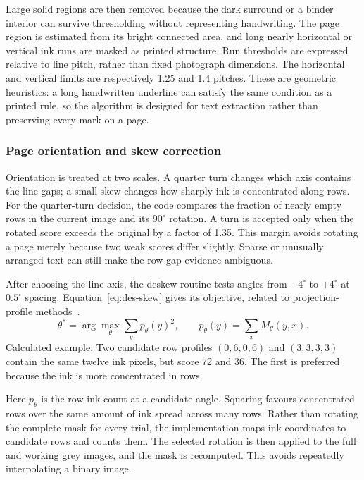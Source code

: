 Large solid regions are then removed because the dark surround or a binder interior can survive thresholding without representing handwriting. The page region is estimated from its bright connected area, and long nearly horizontal or vertical ink runs are masked as printed structure. Run thresholds are expressed relative to line pitch, rather than fixed photograph dimensions. The horizontal and vertical limits are respectively 1.25 and 1.4 pitches. These are geometric heuristics: a long handwritten underline can satisfy the same condition as a printed rule, so the algorithm is designed for text extraction rather than preserving every mark on a page.

\subsubsection{Page orientation and skew correction}
Orientation is treated at two scales. A quarter turn changes which axis contains the line gaps; a small skew changes how sharply ink is concentrated along rows. For the quarter-turn decision, the code compares the fraction of nearly empty rows in the current image and its $90^\circ$ rotation. A turn is accepted only when the rotated score exceeds the original by a factor of 1.35. This margin avoids rotating a page merely because two weak scores differ slightly. Sparse or unusually arranged text can still make the row-gap evidence ambiguous.


After choosing the line axis, the deskew routine tests angles from $-4^\circ$ to $+4^\circ$ at $0.5^\circ$ spacing. Equation~\ref{eq:des-skew} gives its objective, related to projection-profile methods~\cite[page to verify]{postl1986}.
\begin{equation}
\theta^*=\arg\max_\theta\sum_y p_\theta(y)^2,\qquad
p_\theta(y)=\sum_x M_\theta(y,x).
\label{eq:des-skew}
\end{equation}
Calculated example: Two candidate row profiles $(0,6,0,6)$ and $(3,3,3,3)$ contain the same twelve ink pixels, but score $72$ and $36$. The first is preferred because the ink is more concentrated in rows.

Here $p_\theta$ is the row ink count at a candidate angle. Squaring favours concentrated rows over the same amount of ink spread across many rows. Rather than rotating the complete mask for every trial, the implementation maps ink coordinates to candidate rows and counts them. The selected rotation is then applied to the full and working grey images, and the mask is recomputed. This avoids repeatedly interpolating a binary image.

